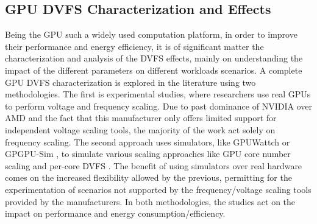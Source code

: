 \subsection{GPU DVFS Characterization and Effects}

Being the GPU such a widely used computation platform, in order to improve their performance and energy efficiency, it is of significant matter the characterization and analysis of the DVFS effects, mainly on understanding the impact of the different parameters on different workloads scenarios. A complete GPU DVFS characterization is explored in the literature using two methodologies. The first is experimental studies, where researchers use real GPUs to perform voltage and frequency scaling. Due to past dominance of NVIDIA over AMD \cite{noauthor_jon_nodate} \cite{mujtaba_amd_2019} and the fact that this manufacturer only offers limited support for independent voltage scaling tools, the majority of the work act solely on frequency scaling. The second approach uses simulators, like GPUWattch \cite{noauthor_gpu_nodate} or GPGPU-Sim \cite{noauthor_gpgpu-sim/gpgpu-sim_distribution_2019,},  to simulate various scaling approaches like GPU core number scaling and per-core DVFS \cite{mei_survey_2016}. The benefit of using simulators over real hardware comes on the increased flexibility allowed by the previous, permitting for the experimentation of scenarios not supported by the frequency/voltage scaling tools provided by the manufacturers. In both methodologies, the studies act on the impact on performance and energy consumption/efficiency.







